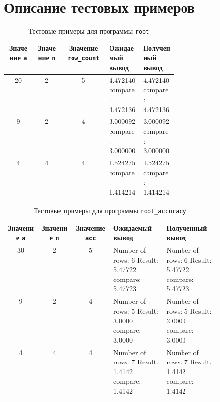 \newpage
\section{Описание тестовых примеров}

\begin{table}[H]
  \centering
  \begin{tabular}{|| c | c | c | p{0.2\linewidth} | p{0.2\linewidth} ||}
    \hline
    Значение \texttt{a} & Значение \texttt{n} & Значение \texttt{row\_count} & Ожидаемый вывод & Полученный вывод \\
    \hline\hline
    20 & 2 & 5 & 4.472140 \newline compare: 4.472136 & 4.472140 \newline compare: 4.472136 \\
    \hline
    9 & 2 & 4 & 3.000092 \newline compare: 3.000000 & 3.000092 \newline compare: 3.000000 \\
    \hline
    4 & 4 & 4 & 1.524275 \newline compare: 1.414214 & 1.524275 \newline compare: 1.414214 \\
    \hline
  \end{tabular}
  \caption{Тестовые примеры для программы \texttt{root}}
\end{table}

\begin{table}[H]
  \centering
  \begin{tabular}{|| c | c | c | p{0.25\linewidth} | p{0.25\linewidth} ||}
    \hline
    Значение \texttt{a} & Значение \texttt{n} & Значение \texttt{acc} & Ожидаемый вывод & Полученный вывод \\
    \hline\hline
    30 & 2 & 5 & Number of rows: 6 \newline Result: 5.47722 \newline compare: 5.47723 & Number of rows: 6 \newline Result: 5.47722 \newline compare: 5.47723 \\
    \hline
    9 & 2 & 4 & Number of rows: 5 \newline Result: 3.0000 \newline compare: 3.0000 & Number of rows: 5 \newline Result: 3.0000 \newline compare: 3.0000 \\
    \hline
    4 & 4 & 4 & Number of rows: 7 \newline Result: 1.4142 \newline compare: 1.4142 & Number of rows: 7 \newline Result: 1.4142 \newline compare: 1.4142 \\
    \hline
  \end{tabular}
  \caption{Тестовые примеры для программы \texttt{root\_accuracy}}
\end{table}
